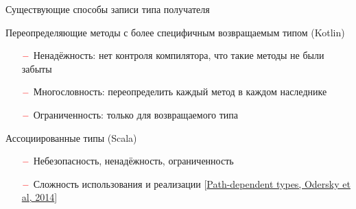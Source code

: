 \documentclass[usenames, dvipsnames]{beamer}
\begin{document}
\begin{frame}[fragile]{Существующие способы записи типа получателя}
        \begin{block}{Переопределяющие методы с более специфичным возвращаемым типом (Kotlin)}
            \begin{itemize}
                \item[$\color{red} -$] Ненадёжность: нет контроля компилятора, что такие методы не были забыты
                \item[$\color{red} -$] Многословность: переопределить каждый метод в каждом наследнике
                \item[$\color{red} -$] Ограниченность: только для возвращаемого типа
            \end{itemize}
        \end{block}

        \begin{block}{Ассоциированные типы (Scala)}
            \begin{itemize}
                \item[$\color{red} -$] Небезопасность, ненадёжность, ограниченность
                \item[$\color{red} -$] Сложность использования и реализации [\href{http://lampwww.epfl.ch/~amin/dot/fpdt_post.pdf}{Path-dependent types, Odersky et al, 2014}]
            \end{itemize}
        \end{block}
    \end{frame}
\end{document}
